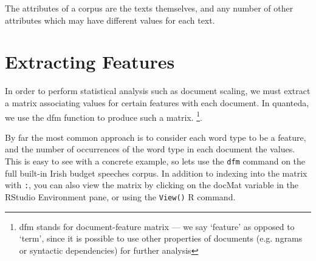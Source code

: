 \documentclass[11pt]{article}\usepackage[]{graphicx}\usepackage[]{color}
\begin{document}
The attributes of a corpus are the texts themselves, and any number of other attributes which may have different values for each text.



\section{Extracting Features}

In order to perform statistical analysis such as document scaling, we must extract a matrix associating values for certain features with each document. In quanteda, we use the dfm function to produce such a matrix. \footnote{dfm stands for document-feature matrix --- we say `feature' as opposed to `term', since it is possible to use other properties of documents (e.g. ngrams or syntactic dependencies) for further analysis}. 

By far the most common approach is to consider each word type to be a feature, and the number of occurrences of the word type in each document the values. This is easy to see with a concrete example, so lets use the \texttt{dfm} command on the full built-in Irish budget speeches corpus. In addition to indexing into the matrix with \texttt{:}, you can also view the matrix by clicking on the docMat variable in the RStudio Environment pane, or using the \texttt{View()} R command.
\end{document}
